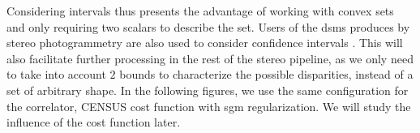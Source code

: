 Considering intervals thus presents the advantage of working with convex sets and only requiring two scalars to describe the set. Users of the \acrshort{dsm}s produces by stereo photogrammetry are also used to consider confidence intervals \cite{oksanen_digital_2006, wang_robust_2015, panagiotakis_validation_2018, deschamps-berger_apport_2021, hugonnet_uncertainty_2022}. This will also facilitate further processing in the rest of the stereo pipeline, as we only need to take into account $2$ bounds to characterize the possible disparities, instead of a set of arbitrary shape. In the following figures, we use the same configuration for the correlator, \ie CENSUS cost function with \acrshort{sgm} regularization. We will study the influence of the cost function later.

